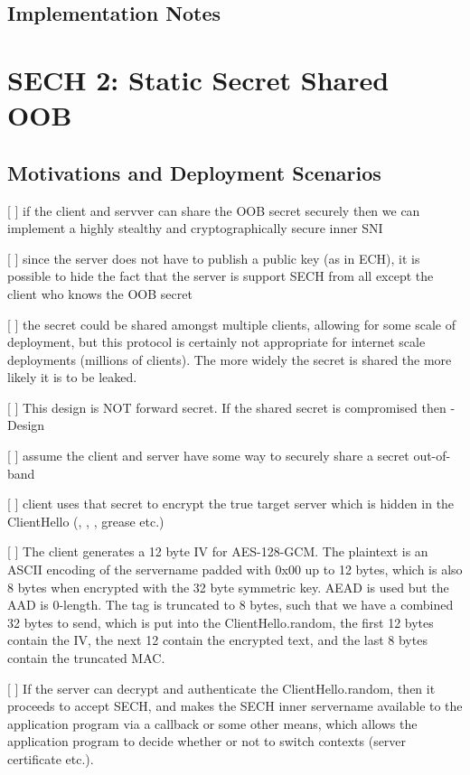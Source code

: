 \subsection{Implementation Notes}
\section{SECH 2: Static Secret Shared OOB}
\subsection{Motivations and Deployment Scenarios}

[ ] if the client and servver can share the OOB secret securely then we can implement a highly stealthy and cryptographically secure inner SNI

[ ] since the server does not have to publish a public key (as in ECH), it is possible to hide the fact that the server is support SECH from all except the client who knows the OOB secret

[ ] the secret could be shared amongst multiple clients, allowing for some scale of deployment, but this protocol is certainly not appropriate for internet scale deployments (millions of clients). The more widely the secret is shared the more likely it is to be leaked.

[ ] This design is NOT forward secret. If the shared secret is compromised then 
  - Design

[ ] assume the client and server have some way to securely share a secret out-of-band

[ ] client uses that secret to encrypt the true target server which is hidden in the ClientHello (, , , grease etc.)

[ ] The client generates a 12 byte IV for AES-128-GCM. The plaintext is an ASCII encoding of the servername padded with 0x00 up to 12 bytes, which is also 8 bytes when encrypted with the 32 byte symmetric key. AEAD is used but the AAD is 0-length. The tag is truncated to 8 bytes, such that we have a combined 32 bytes to send, which is put into the ClientHello.random, the first 12 bytes contain the IV, the next 12 contain the encrypted text, and the last 8 bytes contain the truncated MAC.

[ ] If the server can decrypt and authenticate the ClientHello.random, then it proceeds to accept SECH, and makes the SECH inner servername available to the application program via a callback or some other means, which allows the application program to decide whether or not to switch contexts (server certificate etc.).

